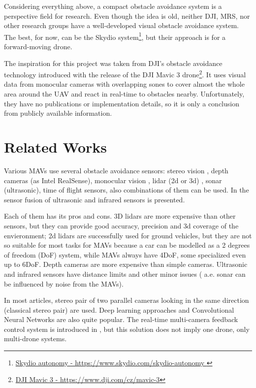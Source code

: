 Considering everything above, a compact obstacle avoidance system is a perspective field for research. 
Even though the idea is old, neither DJI, MRS, nor other research groups have a well-developed visual obstacle avoidance system. 
The best, for now, can be the Skydio system\footnote{\href{https://www.skydio.com/skydio-autonomy}{Skydio autonomy - https://www.skydio.com/skydio-autonomy }}, but their approach is for a forward-moving drone.

The inspiration for this project was taken from DJI's obstacle avoidance technology introduced with the release of the DJI Mavic 3 drone\footnote{\href{https://www.dji.com/cz/mavic-3}{DJI Mavic 3 - https://www.dji.com/cz/mavic-3}}. 
It uses visual data from monocular cameras with overlapping sones to cover almost the whole area around the UAV and react in real-time to obstacles nearby. 
Unfortunately, they have no publications or implementation details, so it is only a conclusion from publicly available information.

\section{Related Works}
Various MAVs use several obstacle avoidance sensors: stereo vision \cite{Ruf2018}, depth cameras (as Intel RealSense), monocular vision \cite{Mejias2010}, lidar (2d or 3d) \cite{Ramasamy2016}, sonar (ultrasonic), time of flight sensors, also combinations of them can be used. 
In \cite{Rambabu2015} the sensor fusion of ultrasonic and infrared sensors is presented.

Each of them has its pros and cons. 
3D lidars are more expensive than other sensors, but they can provide good accuracy, precision and 3d coverage of the envieronment; 2d lidars are successfully used for ground vehicles, but they are not so suitable for most tasks for MAVs because a car can be modelled as a 2 degrees of freedom (DoF) system, while MAVs always have 4DoF, some specialized even up to 6DoF. 
Depth cameras are more expensive than simple cameras. Ultrasonic and infrared sensors have distance limits and other minor issues ( a.e. sonar can be influenced by noise from the MAVs). 

In most articles, stereo pair of two parallel cameras looking in the same direction (classical stereo pair) \cite{Lin2021, Xiao2019} are used.
Deep learning approaches \cite{Back2020, FragaLamas2019, Park2020, Roghair2021} and Convolutional Neural Networks \cite{Yu2013, Ma2020} are also quite popular.
The real-time multi-camera feedback control system is introduced in \cite{He2021}, but this solution does not imply one drone, only multi-drone systems.

